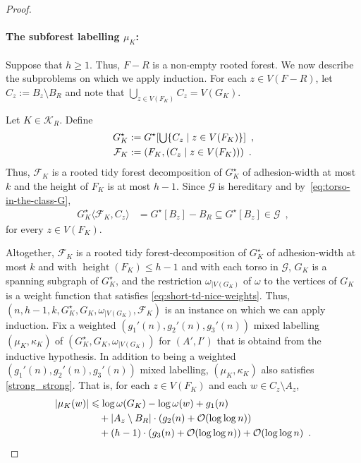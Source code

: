 \documentclass{patmorin}
\let\eqref\cref
\renewcommand{\le}{\leqslant}
\renewcommand{\geq}{\geqslant}
\newcommand{\torso}[2]{{#1}\langle{#2}\rangle}
\DeclareMathOperator{\height}{height}
\newcommand{\Oh}{\calO}
\DeclarePairedDelimiter{\set}{\{}{\}}
\newcommand{\calF}{\mathcal{F}}
\newcommand{\calG}{\mathcal{G}}
\newcommand{\calK}{\mathcal{K}}
\newcommand{\calO}{\mathcal{O}}
\begin{document}
\begin{proof}
    \paragraph{\boldmath The subforest labelling $\mu_K$:}
    Suppose that $h\geq1$. Thus, $F-R$ is a non-empty rooted forest. We now describe the subproblems on which we apply induction. For each $z\in V(F-R)$, let $C_z:=B_z\setminus B_R$ and
    note that $\bigcup_{z\in V(F_K)}C_z=V(G_K)$.

    Let $K\in\calK_R$. Define
    \begin{align*}
        G^\star_K&:=G^\star[\textstyle\bigcup\set{C_z\mid z\in V(F_K)}]\enspace,\\
        \calF_K&:=(F_K, (C_z \mid z\in V(F_K)))\enspace.
    \end{align*}
    Thus, $\calF_K$ is a rooted tidy forest decomposition of $G^\star_K$ of adhesion-width at most $k$ and the height of $F_K$ is at most $h-1$.
    Since $\calG$ is hereditary and by~\eqref{eq:torso-in-the-class-G},
    \begin{align*}
        \torso{G^\star_K}{\calF_K,C_z}&=G^\star[B_z]-B_R\subseteq G^\star[B_z]\in \calG\enspace ,
    \end{align*}
    for every $z \in V(F_K)$.

    Altogether, $\calF_K$ is a rooted tidy forest-decomposition of $G^\star_K$ of adhesion-width at most $k$ and with $\height(F_K)\le h-1$ and with each torso in $\calG$, $G_K$ is a spanning subgraph of $G^\star_K$, and the restriction
    $\omega_{|V(G_K)}$ of $\omega$ to the vertices of $G_K$ is a weight function that satisfies \eqref{eq:short-td-nice-weights}.  Thus, $(n,h-1,k,G^\star_K,G_K,\omega_{|V(G_K)},\calF_K)$ is an instance on which we can apply induction.
    Fix a weighted $(g_1'(n),g_2'(n),g_3'(n))$ mixed labelling $(\mu_K,\kappa_K)$ of $(G^\star_K,G_K,\omega_{|V(G_K)})$ for $(A',I')$ that is obtaind from the inductive hypothesis.
    In addition to being a weighted $(g_1'(n),g_2'(n),g_3'(n))$ mixed labelling, $(\mu_K,\kappa_K)$ also satisfies \eqref{strong_strong}.  That is, for each $z\in V(F_K)$ and each $w\in C_z\setminus A_z$,
    \begin{align}
       |\mu_K(w)| & \le \log \omega(G_K) - \log\omega(w) + g_1(n) \notag \\
       & \quad {} + |A_z\setminus B_R|\cdot (g_2(n) + \Oh(\log\log n)) \label{mu_Kw} \\
       & \quad {} + (h-1)\cdot (g_3(n) + \Oh(\log\log n)) +\Oh(\log\log n) \enspace . \notag
    \end{align}


\end{proof}
\end{document}
